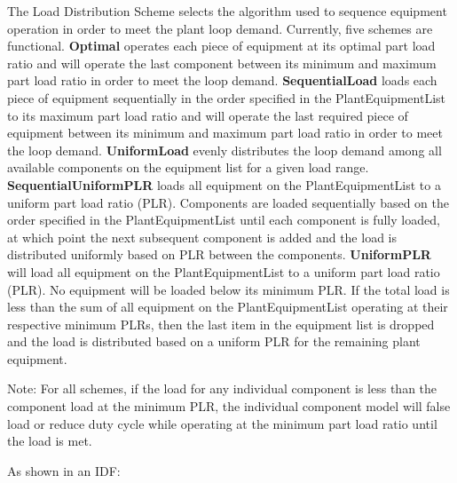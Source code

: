 The Load Distribution Scheme selects the algorithm used to sequence equipment operation in order to meet the plant loop demand. Currently, five schemes are functional. \textbf{Optimal} operates each piece of equipment at its optimal part load ratio and will operate the last component between its minimum and maximum part load ratio in order to meet the loop demand. \textbf{SequentialLoad} loads each piece of equipment sequentially in the order specified in the PlantEquipmentList to its maximum part load ratio and will operate the last required piece of equipment between its minimum and maximum part load ratio in order to meet the loop demand. \textbf{UniformLoad} evenly distributes the loop demand among all available components on the equipment list for a given load range. \textbf{SequentialUniformPLR} loads all equipment on the PlantEquipmentList to a uniform part load ratio (PLR). Components are loaded sequentially based on the order specified in the PlantEquipmentList until each component is fully loaded, at which point the next subsequent component is added and the load is distributed uniformly based on PLR between the components. \textbf{UniformPLR} will load all equipment on the PlantEquipmentList to a uniform part load ratio (PLR). No equipment will be loaded below its minimum PLR. If the total load is less than the sum of all equipment on the PlantEquipmentList operating at their respective minimum PLRs, then the last item in the equipment list is dropped and the load is distributed based on a uniform PLR for the remaining plant equipment.

Note: For all schemes, if the load for any individual component is less than the component load at the minimum PLR, the individual component model will false load or reduce duty cycle while operating at the minimum part load ratio until the load is met.

As shown in an IDF:

